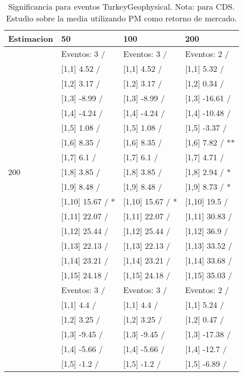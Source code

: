 \begin{table}

\caption{Significancia para eventos TurkeyGeophysical. Nota: para CDS. Estudio sobre la media utilizando PM como retorno de mercado.}
\centering
\begin{tabular}[t]{llll}
\toprule
Estimacion & 50 & 100 & 200\\
\midrule
 & Eventos:  3 / & Eventos:  3 / & Eventos:  2 /\\
 & {}[1,1] 4.52  / & {}[1,1] 4.52  / & {}[1,1] 5.32  /\\
 & {}[1,2] 3.17  / & {}[1,2] 3.17  / & {}[1,2] 0.34  /\\
 & {}[1,3] -8.99  / & {}[1,3] -8.99  / & {}[1,3] -16.61  /\\
 & {}[1,4] -4.24  / & {}[1,4] -4.24  / & {}[1,4] -10.48  /\\
\addlinespace
 & {}[1,5] 1.08  / & {}[1,5] 1.08  / & {}[1,5] -3.37  /\\
 & {}[1,6] 8.35  / & {}[1,6] 8.35  / & {}[1,6] 7.82  / **\\
 & {}[1,7] 6.1  / & {}[1,7] 6.1  / & {}[1,7] 4.71  /\\
200 & {}[1,8] 3.85  / & {}[1,8] 3.85  / & {}[1,8] 2.94  / *\\
 & {}[1,9] 8.48  / & {}[1,9] 8.48  / & {}[1,9] 8.73  / *\\
\addlinespace
 & {}[1,10] 15.67  / * & {}[1,10] 15.67  / * & {}[1,10] 19.5  /\\
 & {}[1,11] 22.07  / & {}[1,11] 22.07  / & {}[1,11] 30.83  /\\
 & {}[1,12] 25.44  / & {}[1,12] 25.44  / & {}[1,12] 36.9  /\\
 & {}[1,13] 22.13  / & {}[1,13] 22.13  / & {}[1,13] 33.52  /\\
 & {}[1,14] 23.21  / & {}[1,14] 23.21  / & {}[1,14] 33.68  /\\
\addlinespace
 & {}[1,15] 24.18  / & {}[1,15] 24.18  / & {}[1,15] 35.03  /\\
 & Eventos:  3 / & Eventos:  3 / & Eventos:  2 /\\
 & {}[1,1] 4.4  / & {}[1,1] 4.4  / & {}[1,1] 5.24  /\\
 & {}[1,2] 3.25  / & {}[1,2] 3.25  / & {}[1,2] 0.47  /\\
 & {}[1,3] -9.45  / & {}[1,3] -9.45  / & {}[1,3] -17.38  /\\
\addlinespace
 & {}[1,4] -5.66  / & {}[1,4] -5.66  / & {}[1,4] -12.7  /\\
 & {}[1,5] -1.2  / & {}[1,5] -1.2  / & {}[1,5] -6.89  /\\

\end{tabular}
\end{table}
